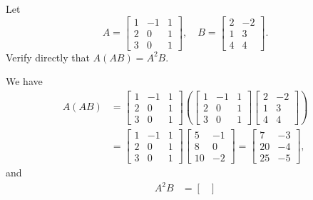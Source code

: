 \label{eq:lin-eq:mat-mul:A-sq-B}
Let
\begin{equation*}
  A =
  \begin{bmatrix}
    1 & -1 & 1 \\
    2 & 0 & 1 \\
    3 & 0 & 1
  \end{bmatrix},
  \quad
  B =
  \begin{bmatrix}
    2 & -2 \\
    1 & 3 \\
    4 & 4
  \end{bmatrix}.
\end{equation*}
Verify directly that $A(AB) = A^2B$.
\begin{solution}
  We have
  \begin{align*}
    A(AB)
    &=
    \begin{bmatrix}
      1 & -1 & 1 \\
      2 & 0 & 1 \\
      3 & 0 & 1
    \end{bmatrix}
    \left(
      \begin{bmatrix}
        1 & -1 & 1 \\
        2 & 0 & 1 \\
        3 & 0 & 1
      \end{bmatrix}
      \begin{bmatrix}
        2 & -2 \\
        1 & 3 \\
        4 & 4
      \end{bmatrix}
    \right) \\
    &=
    \begin{bmatrix}
      1 & -1 & 1 \\
      2 & 0 & 1 \\
      3 & 0 & 1
    \end{bmatrix}
    \begin{bmatrix}
      5 & -1 \\
      8 & 0 \\
      10 & -2
    \end{bmatrix}
    =
    \begin{bmatrix}
      7 & -3 \\
      20 & -4 \\
      25 & -5
    \end{bmatrix},
  \end{align*}
  and
  \begin{align*}
    A^2B
    &=
    \begin{bmatrix}

\end{bmatrix}
\end{align*}
\end{solution}
